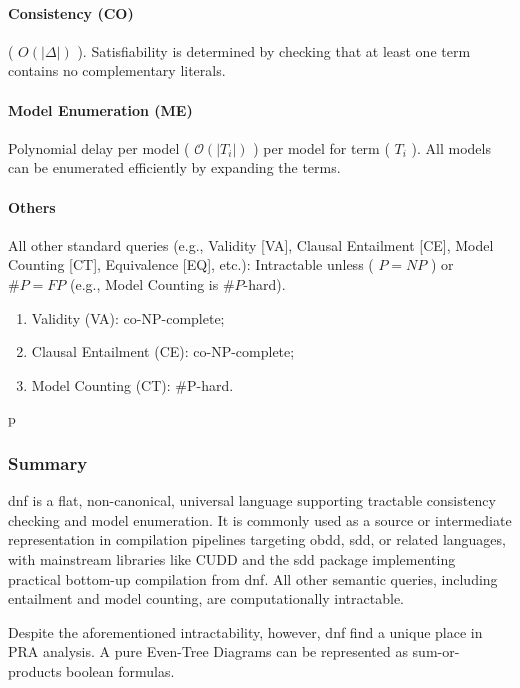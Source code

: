 \paragraph{Consistency (CO)} ( $O(\lvert \Delta\rvert)$ ). Satisfiability is determined by checking that at least one term contains no complementary literals.
\paragraph{Model Enumeration (ME)} Polynomial delay per model ( $\mathcal{O}(\lvert T_i\rvert)$ ) per model for term ( $T_i$ ). All models can be enumerated efficiently by expanding the terms.
\paragraph{Others} All other standard queries (e.g., Validity [VA], Clausal Entailment [CE], Model Counting [CT], Equivalence [EQ], etc.): Intractable unless ( $P=NP$ ) or $\#P=FP$ (e.g., Model Counting is $\#P$-hard).
\begin{enumerate}
    \item Validity (VA): co-NP-complete;
    \item Clausal Entailment (CE): co-NP-complete;
    \item Model Counting (CT): \#P-hard.
\end{enumerate}

p
\subsubsection{Summary}
\acrshort{dnf} is a flat, non-canonical, universal language supporting tractable consistency checking and model enumeration. It is commonly used as a source or intermediate representation in compilation pipelines targeting  \acrshort{obdd},  \acrshort{sdd}, or related languages, with mainstream libraries like CUDD and the  \acrshort{sdd} package implementing practical bottom-up compilation from \acrshort{dnf}. All other semantic queries, including entailment and model counting, are computationally intractable.

Despite the aforementioned intractability, however, \acrshort{dnf} find a unique place in PRA analysis. A pure Even-Tree Diagrams can be represented as sum-or-products boolean formulas.

